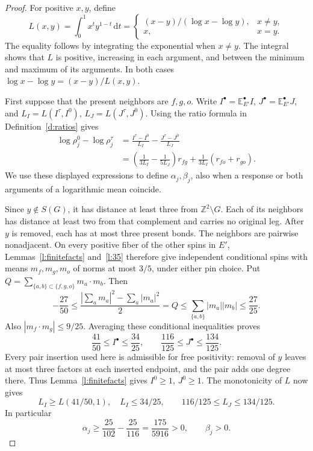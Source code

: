 \begin{proof}
For positive \(x,y\), define
\[
 L(x,y)=\int_0^1x^t y^{1-t}\,\mathrm dt
 =\begin{cases}
 (x-y)/(\log x-\log y),&x\ne y,\\
 x,&x=y.
 \end{cases}
\]
The equality follows by integrating the exponential when \(x\ne y\).
The integral shows that \(L\) is positive, increasing in each argument,
and between the minimum and maximum of its arguments. In both cases
\(\log x-\log y=(x-y)/L(x,y)\).

First suppose that the present neighbors are \(f,g,o\).
Write \(I^\bullet=\mathbb E^\bullet_{E'}I\),
\(J^\bullet=\mathbb E^\bullet_{E'}J\), and
\(L_I=L(I^\tau,I^0)\), \(L_J=L(J^\tau,J^0)\).
Using the ratio formula in Definition~\ref{d:ratios} gives
\[
 \begin{split}
 \log\rho_j^0-\log\rho_j^\tau
 &=\frac{I^\tau-I^0}{L_I}
       -\frac{J^\tau-J^0}{L_J}\\
 &=\left(\frac1{3L_I}-\frac1{5L_J}\right)r_{fg}
       +\frac1{3L_I}(r_{fo}+r_{go}).
 \end{split}
\]
We use these displayed expressions to define \(\alpha_j,\beta_j\),
also when a response or both arguments of a logarithmic mean coincide.

Since \(y\notin S(G)\), it has distance at least three from
\(\mathbb Z^2\setminus G\). Each of its neighbors has distance
at least two from that complement and carries no original leg.
After \(y\) is removed, each has at most three present bonds.
The neighbors are pairwise nonadjacent. On every positive fiber
of the other spins in \(E'\), Lemmas~\ref{l:finitefacts}
and~\ref{l:35} therefore give independent conditional spins with
means \(m_f,m_g,m_o\) of norms at most \(3/5\), under either
pin choice. Put \(Q=\sum_{\{a,b\}\subset\{f,g,o\}}m_a\cdot m_b\).
Then
\[
 -\frac{27}{50}\le
 \frac{|\sum_a m_a|^2-\sum_a|m_a|^2}{2}=Q
 \le\sum_{\{a,b\}}|m_a||m_b|\le\frac{27}{25}.
\]
Also \(|m_f\cdot m_g|\le9/25\).
Averaging these conditional inequalities proves
\[
 \frac{41}{50}\le I^\bullet\le\frac{34}{25},\qquad
 \frac{116}{125}\le J^\bullet\le\frac{134}{125}.
\]
Every pair insertion used here is admissible for free positivity:
removal of \(y\) leaves at most three factors at each inserted
endpoint, and the pair adds one degree there.
Thus Lemma~\ref{l:finitefacts} gives \(I^0\ge1\), \(J^0\ge1\).
The monotonicity of \(L\) now gives
\[
 L_I\ge L(41/50,1),\quad L_I\le34/25,\qquad
 116/125\le L_J\le134/125.
\]
In particular
\[
 \alpha_j\ge\frac{25}{102}-\frac{25}{116}
       =\frac{175}{5916}>0,\qquad \beta_j>0.
\]


\end{proof}
